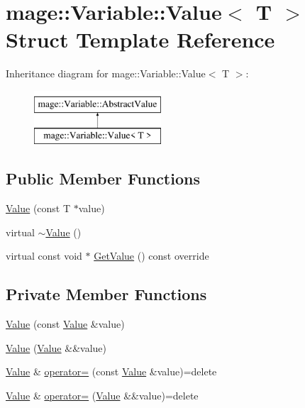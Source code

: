 \hypertarget{structmage_1_1_variable_1_1_value}{}\section{mage\+:\+:Variable\+:\+:Value$<$ T $>$ Struct Template Reference}
\label{structmage_1_1_variable_1_1_value}
Inheritance diagram for mage\+:\+:Variable\+:\+:Value$<$ T $>$\+:\begin{figure}[H]
\begin{center}
\leavevmode
\includegraphics[height=2.000000cm]{structmage_1_1_variable_1_1_value}
\end{center}
\end{figure}
\subsection*{Public Member Functions}
\begin{DoxyCompactItemize}
\item 
\hyperlink{structmage_1_1_variable_1_1_value_a1e29cc5eaeb8356a11a1eca0232cf162}{Value} (const T $\ast$value)
\item 
virtual \hyperlink{structmage_1_1_variable_1_1_value_ab0b88d59c1049b89557fbaf649a3b459}{$\sim$\+Value} ()
\item 
virtual const void $\ast$ \hyperlink{structmage_1_1_variable_1_1_value_a04d70496ebb7ad71dafa3df877daeb26}{Get\+Value} () const override
\end{DoxyCompactItemize}
\subsection*{Private Member Functions}
\begin{DoxyCompactItemize}
\item 
\hyperlink{structmage_1_1_variable_1_1_value_a083583e9c9c59eae659db2bfdf4b6629}{Value} (const \hyperlink{structmage_1_1_variable_1_1_value}{Value} \&value)
\item 
\hyperlink{structmage_1_1_variable_1_1_value_a5c6f523b3fbd8547b18420de9a0b372e}{Value} (\hyperlink{structmage_1_1_variable_1_1_value}{Value} \&\&value)
\item 
\hyperlink{structmage_1_1_variable_1_1_value}{Value} \& \hyperlink{structmage_1_1_variable_1_1_value_a19c45282edac9ffaa0f687b7dd414392}{operator=} (const \hyperlink{structmage_1_1_variable_1_1_value}{Value} \&value)=delete
\item 
\hyperlink{structmage_1_1_variable_1_1_value}{Value} \& \hyperlink{structmage_1_1_variable_1_1_value_a2185d5eeb8f321a7e4f6d97463af4987}{operator=} (\hyperlink{structmage_1_1_variable_1_1_value}{Value} \&\&value)=delete
\end{DoxyCompactItemize}
